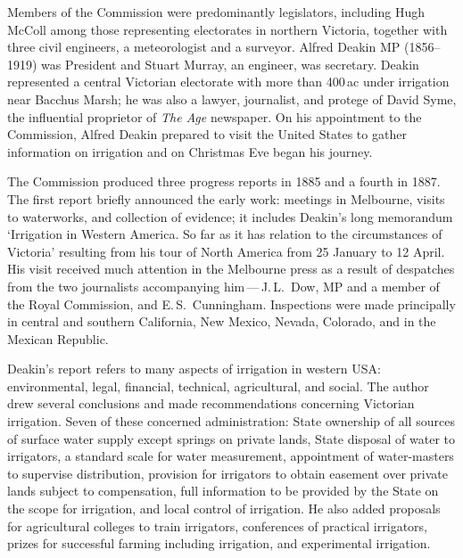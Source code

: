 Members of the Commission were predominantly legislators, including
Hugh McColl among those representing electorates in northern Victoria,
together with three civil engineers, a meteorologist and a surveyor.
Alfred Deakin MP (1856--1919) was President and Stuart Murray,
 an
engineer, was secretary.  Deakin represented a central Victorian
electorate with more than 400\,ac under irrigation near Bacchus Marsh;
he was also a lawyer, journalist, and protege of David Syme,
 the
influential proprietor of \textit{The Age} newspaper.  On his
appointment to the Commission, Alfred Deakin prepared to visit the
United States
 to
gather information on irrigation and on Christmas Eve began his
journey.

The Commission produced three progress reports in 1885 and a four\-th
in 1887.  The first report briefly announced the early work: meetings
in Melbourne, visits to waterworks, and collection of evidence; it
includes Deakin's  long memorandum `Irrigation in
Western America. So far as it has relation to the
circumstances of Victoria' resulting from his tour of North America
from 25 January to 12 April.  His visit received much attention in the
Melbourne press as a result of despatches from the two journalists
accompanying him\,---\,J.\,L.~Dow,  MP and a member
of the Royal Commission, and E.\,S.~Cunningham.   Inspections were made principally in central and southern
California, New Mexico, Nev\-ada, Colorado, and in
the Mexican Republic. 

Deakin's report refers to many aspects of irrigation in western
USA: environmental, legal, financial,
technical, agricultural, and social.  The author drew several
conclusions and made recommendations concerning Victorian irrigation.
Seven of these concerned administration: State ownership of all
sources of surface water supply except springs on private lands, State
disposal of water to irrigators, a standard scale for water
measurement, appointment of water-masters to supervise distribution,
provision for irrigators to obtain easement over private lands subject
to compensation, full information to be provided by the State on the
scope for irrigation, and local control of irrigation.  He also added
proposals for agricultural colleges to train irrigators, conferences
of practical irrigators, prizes for successful farming including
irrigation, and experimental irrigation.

